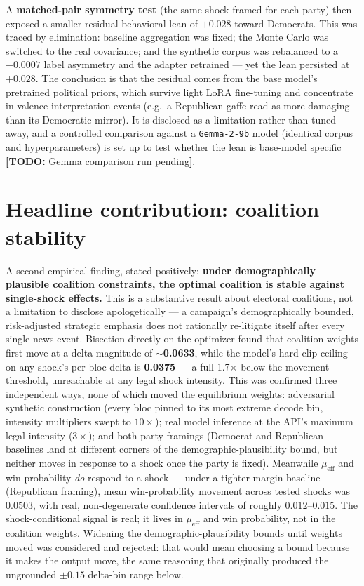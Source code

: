 \documentclass[11pt]{article}
\newcommand{\todo}[1]{{\color{red}\textbf{[TODO:} #1\textbf{]}}}
\begin{document}
A \textbf{matched-pair symmetry test} (the same shock framed for each party) then
exposed a smaller residual behavioral lean of \textbf{$+0.028$} toward Democrats.
This was traced by elimination: baseline aggregation was fixed; the Monte Carlo
was switched to the real covariance; and the synthetic corpus was rebalanced to a
$-0.0007$ label asymmetry and the adapter retrained --- yet the lean persisted at
$+0.028$. The conclusion is that the residual comes from the base model's
pretrained political priors, which survive light LoRA fine-tuning and concentrate
in valence-interpretation events (e.g.\ a Republican gaffe read as more damaging
than its Democratic mirror). It is disclosed as a limitation rather than tuned
away, and a controlled comparison against a \texttt{Gemma-2-9b} model (identical
corpus and hyperparameters) is set up to test whether the lean is base-model
specific \todo{Gemma comparison run pending}.

\section*{Headline contribution: coalition stability}
A second empirical finding, stated positively: \textbf{under demographically
plausible coalition constraints, the optimal coalition is stable against
single-shock effects.} This is a substantive result about electoral
coalitions, not a limitation to disclose apologetically --- a campaign's
demographically bounded, risk-adjusted strategic emphasis does not rationally
re-litigate itself after every single news event. Bisection directly on the
optimizer found that coalition weights first move at a delta magnitude of
\textbf{$\sim$0.0633}, while the model's hard clip ceiling on any shock's
per-bloc delta is \textbf{0.0375} --- a full 1.7$\times$ below the movement
threshold, unreachable at any legal shock intensity. This was confirmed three
independent ways, none of which moved the equilibrium weights: adversarial
synthetic construction (every bloc pinned to its most extreme decode bin,
intensity multipliers swept to $10\times$); real model inference at the
API's maximum legal intensity ($3\times$); and both party framings (Democrat
and Republican baselines land at different corners of the
demographic-plausibility bound, but neither moves in response to a shock once
the party is fixed). Meanwhile $\mu_{\text{eff}}$ and win probability
\emph{do} respond to a shock --- under a tighter-margin baseline (Republican
framing), mean win-probability movement across tested shocks was $0.0503$,
with real, non-degenerate confidence intervals of roughly
$0.012$--$0.015$. The shock-conditional signal is real; it lives in
$\mu_{\text{eff}}$ and win probability, not in the coalition weights.
Widening the demographic-plausibility bounds until weights moved was
considered and rejected: that would mean choosing a bound because it makes
the output move, the same reasoning that originally produced the ungrounded
$\pm0.15$ delta-bin range below.
\end{document}
